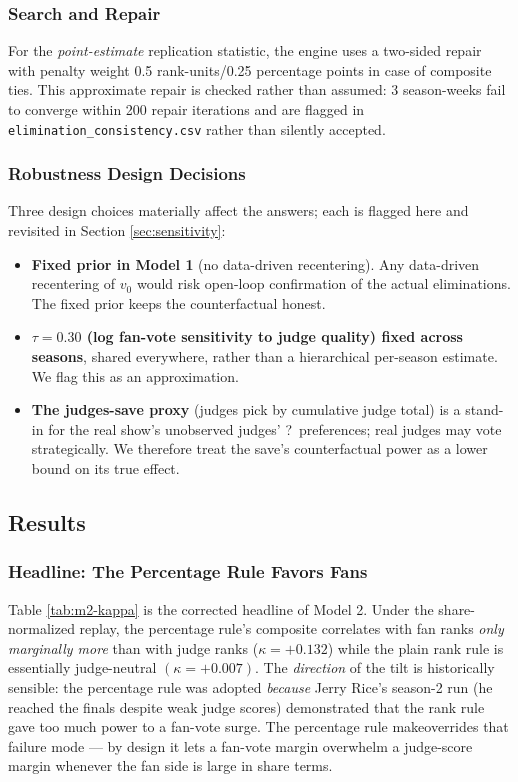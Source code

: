 \documentclass{article}
\begin{document}
\subsubsection{Search and Repair}

For the \emph{point-estimate} replication statistic, the engine uses a two-sided repair with penalty weight 0.5 rank-units/0.25 percentage points in case of composite ties. This approximate repair is checked rather than assumed: 3 season-weeks fail to converge within 200 repair iterations and are flagged in \texttt{elimination\_consistency.csv} rather than silently accepted.

\subsubsection{Robustness Design Decisions}

Three design choices materially affect the answers; each is flagged here and revisited in Section \ref{sec:sensitivity}:
\begin{itemize}
  \item \textbf{Fixed prior in Model 1} (no data-driven recentering). Any data-driven recentering of $v_0$ would risk open-loop confirmation of the actual eliminations. The fixed prior keeps the counterfactual honest.
  \item \textbf{$\tau = 0.30$ (log fan-vote sensitivity to judge quality) fixed across seasons}, shared everywhere, rather than a hierarchical per-season estimate. We flag this as an approximation.
  \item \textbf{The judges-save proxy} (judges pick by cumulative judge total) is a stand-in for the real show's unobserved judges' ?\ preferences; real judges may vote strategically. We therefore treat the save's counterfactual power as a lower bound on its true effect.
\end{itemize}

\subsection{Results}

\subsubsection{Headline: The Percentage Rule Favors Fans}

Table \ref{tab:m2-kappa} is the corrected headline of Model 2. Under the share-normalized replay, the percentage rule's composite correlates with fan ranks \emph{only marginally more} than with judge ranks ($\kappa = +0.132$) while the plain rank rule is essentially judge-neutral $(\kappa = +0.007)$. The \emph{direction} of the tilt is historically sensible: the percentage rule was adopted \emph{because} Jerry Rice's season-2 run (he reached the finals despite weak judge scores) demonstrated that the rank rule gave too much power to a fan-vote surge. The percentage rule makeoverrides that failure mode --- by design it lets a fan-vote margin overwhelm a judge-score margin whenever the fan side is large in share terms.
\end{document}
